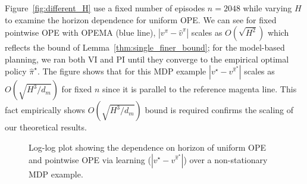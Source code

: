 Figure~\ref{fig:different_H} use a fixed number of episodes $n=2048$ while varying $H$ to examine the horizon dependence for uniform OPE. We can see for fixed pointwise OPE with OPEMA (blue line), $|v^\pi-\widehat{v}^\pi|$ scales as $O(\sqrt{H^2})$ which reflects the bound of Lemma~\ref{thm:single_finer_bound}; for the model-based planning, we ran both VI and PI until they converge to the empirical optimal policy $\widehat{\pi}^\star$. %
The figure shows that for this MDP example $|v^\star-v^{\widehat{\pi}^\star}|$ scales as $O(\sqrt{H^3/d_m})$ for fixed $n$ since it is parallel to the reference magenta line. This fact empirically shows $O(\sqrt{H^3/d_m})$ bound is required %
confirms the scaling of our theoretical results. 

\begin{figure}
	\centering     %
	\caption{Log-log plot  showing the dependence on horizon of uniform OPE and pointwise OPE via learning ($|{v}^{\star}-v^{\widehat{\pi}^\star}|$) over a non-stationary MDP example.}
	\label{fig:main}
\end{figure}


